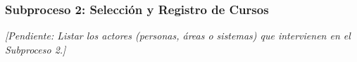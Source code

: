\subsubsection{Subproceso 2: Selección y Registro de Cursos}

\textit{[Pendiente: Listar los actores (personas, áreas o sistemas) que intervienen en el Subproceso 2.]}

